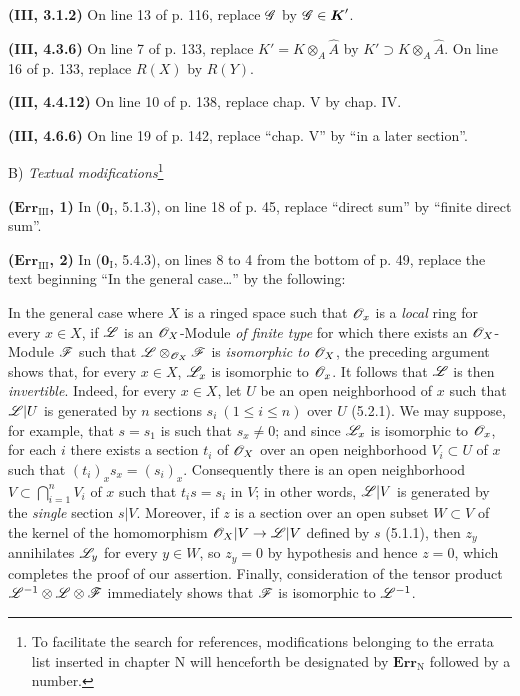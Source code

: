 \noindent\textbf{(\textbf{III}, 3.1.2)} On line 13 of p. 116, replace $\mathscr{G}$ by
$\mathscr{G}\in\boldsymbol{K}'$.

\noindent\textbf{(\textbf{III}, 4.3.6)} On line 7 of p. 133, replace
$K'=K\otimes_A\widehat A$ by $K'\supset K\otimes_A\widehat A$. On line 16 of
p. 133, replace $R(X)$ by $R(Y)$.

\noindent\textbf{(\textbf{III}, 4.4.12)} On line 10 of p. 138, replace chap. V by
chap. IV.

\noindent\textbf{(\textbf{III}, 4.6.6)} On line 19 of p. 142, replace ``chap. V'' by
``in a later section''.

\begin{center}
B) \emph{Textual modifications}\footnote{To facilitate the search for
references, modifications belonging to the errata list inserted in chapter N
will henceforth be designated by $\mathbf{Err}_{\mathrm N}$ followed by a
number.}
\end{center}

\noindent\textbf{($\mathbf{Err}_{\mathrm{III}}$, 1)} In
($\mathbf{0}_{\mathrm I}$, 5.1.3), on line 18 of p. 45, replace ``direct sum'' by
``finite direct sum''.

\noindent\textbf{($\mathbf{Err}_{\mathrm{III}}$, 2)} In
($\mathbf{0}_{\mathrm I}$, 5.4.3), on lines 8 to 4 from the bottom of p. 49, replace
the text beginning ``In the general case\ldots{}'' by the following:

In the general case where $X$ is a ringed space such that $\mathscr{O}_x$ is a
\emph{local} ring for
every $x\in X$, if $\mathscr{L}$ is an $\mathscr{O}_X$-Module \emph{of finite type} for
which there exists an $\mathscr{O}_X$-Module $\mathscr{F}$ such that
$\mathscr{L}\otimes_{\mathscr{O}_X}\mathscr{F}$ is \emph{isomorphic to} $\mathscr{O}_X$, the
preceding argument shows that, for every $x\in X$, $\mathscr{L}_x$ is isomorphic to
$\mathscr{O}_x$. It follows that $\mathscr{L}$ is then \emph{invertible}. Indeed, for
every $x\in X$, let $U$ be an open neighborhood of $x$ such that $\mathscr{L}|U$ is
generated by $n$ sections $s_i\ (1\leq i\leq n)$ over $U$ (5.2.1). We may
suppose, for example, that $s=s_1$ is such that $s_x\ne0$; and since
$\mathscr{L}_x$ is isomorphic to $\mathscr{O}_x$, for each $i$ there exists a section
$t_i$ of $\mathscr{O}_X$ over an open neighborhood $V_i\subset U$ of $x$ such that
$(t_i)_x s_x=(s_i)_x$. Consequently there is an open neighborhood
$V\subset\bigcap_{i=1}^nV_i$ of $x$ such that $t_i s=s_i$ in $V$; in other
words, $\mathscr{L}|V$ is generated by the \emph{single} section $s|V$. Moreover,
if $z$ is a section over an open subset $W\subset V$ of the kernel of the
homomorphism $\mathscr{O}_X|V\to\mathscr{L}|V$ defined by $s$ (5.1.1), then $z_y$
annihilates $\mathscr{L}_y$ for every $y\in W$, so $z_y=0$ by hypothesis and hence
$z=0$, which completes the proof of our assertion. Finally, consideration of
the tensor product $\mathscr{L}^{-1}\otimes\mathscr{L}\otimes\mathscr{F}$ immediately shows
that $\mathscr{F}$ is isomorphic to $\mathscr{L}^{-1}$.


